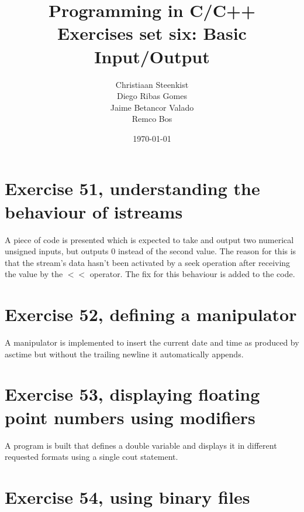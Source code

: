 \documentclass[11pt]{article}
\begin{document}
\title{Programming in C/C++ \\
       Exercises set six: Basic Input/Output
}
\date{\today}
\author{Christiaan Steenkist \\
Diego Ribas Gomes \\
Jaime Betancor Valado \\
Remco Bos \\
}

\maketitle

\section*{Exercise 51, understanding the behaviour of istreams}

A piece of code is presented which is expected to take and output two numerical unsigned inputs, but outputs 0 instead of the second value. The reason for this is that the stream's data hasn't been activated by a seek operation after receiving the value by the $<$$<$ operator. The fix for this behaviour is added to the code.



\section*{Exercise 52, defining a manipulator}

A manipulator is implemented to insert the current date and time as produced by asctime but without the trailing newline it automatically appends.



\section*{Exercise 53, displaying floating point numbers using modifiers}

A program is built that defines a double variable and displays it in different requested formats using a single cout statement.



\section*{Exercise 54, using binary files}
\end{document}
